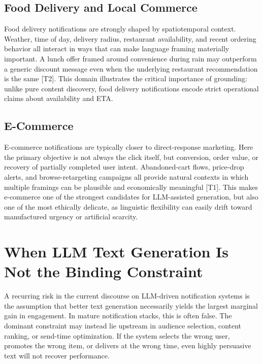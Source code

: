 \documentclass[sigconf]{acmart}
\begin{document}
\subsection{Food Delivery and Local Commerce}

Food delivery notifications are strongly shaped by spatiotemporal context. Weather, time of day, delivery radius, restaurant availability, and recent ordering behavior all interact in ways that can make language framing materially important. A lunch offer framed around convenience during rain may outperform a generic discount message even when the underlying restaurant recommendation is the same \cite{sinha2024doordash} [T2]. This domain illustrates the critical importance of grounding: unlike pure content discovery, food delivery notifications encode strict operational claims about availability and ETA.

\subsection{E-Commerce}

E-commerce notifications are typically closer to direct-response marketing. Here the primary objective is not always the click itself, but conversion, order value, or recovery of partially completed user intent. Abandoned-cart flows, price-drop alerts, and browse-retargeting campaigns all provide natural contexts in which multiple framings can be plausible and economically meaningful \cite{acm2025ecommerce} [T1]. This makes e-commerce one of the strongest candidates for LLM-assisted generation, but also one of the most ethically delicate, as linguistic flexibility can easily drift toward manufactured urgency or artificial scarcity.

\section{When LLM Text Generation Is Not the Binding Constraint}

A recurring risk in the current discourse on LLM-driven notification systems is the assumption that better text generation necessarily yields the largest marginal gain in engagement. In mature notification stacks, this is often false. The dominant constraint may instead lie upstream in audience selection, content ranking, or send-time optimization. If the system selects the wrong user, promotes the wrong item, or delivers at the wrong time, even highly persuasive text will not recover performance.
\end{document}
